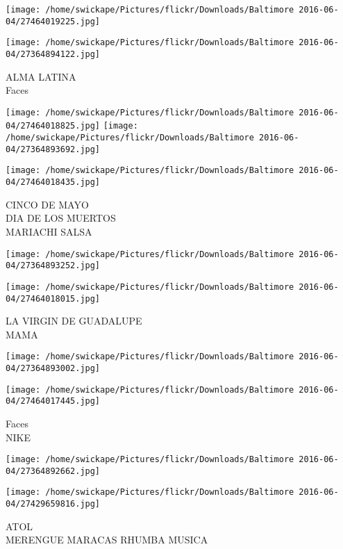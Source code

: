 \documentclass[10pt,letterpaper]{article}
\begin{document}
\texttt{[image: /home/swickape/Pictures/flickr/Downloads/Baltimore 2016-06-04/27464019225.jpg]}

\vspace{0.25in}
\texttt{[image: /home/swickape/Pictures/flickr/Downloads/Baltimore 2016-06-04/27364894122.jpg]}

ALMA LATINA\\
Faces
\pagebreak

\texttt{[image: /home/swickape/Pictures/flickr/Downloads/Baltimore 2016-06-04/27464018825.jpg]}
\texttt{[image: /home/swickape/Pictures/flickr/Downloads/Baltimore 2016-06-04/27364893692.jpg]}

\vspace{0.25in}
\texttt{[image: /home/swickape/Pictures/flickr/Downloads/Baltimore 2016-06-04/27464018435.jpg]}

CINCO DE MAYO\\
DIA DE LOS MUERTOS\\
MARIACHI SALSA
\pagebreak

\texttt{[image: /home/swickape/Pictures/flickr/Downloads/Baltimore 2016-06-04/27364893252.jpg]}

\vspace{0.25in}
\texttt{[image: /home/swickape/Pictures/flickr/Downloads/Baltimore 2016-06-04/27464018015.jpg]}

LA VIRGIN DE GUADALUPE\\
MAMA
\pagebreak

\texttt{[image: /home/swickape/Pictures/flickr/Downloads/Baltimore 2016-06-04/27364893002.jpg]}

\vspace{0.25in}
\texttt{[image: /home/swickape/Pictures/flickr/Downloads/Baltimore 2016-06-04/27464017445.jpg]}

Faces\\
NIKE
\pagebreak

\texttt{[image: /home/swickape/Pictures/flickr/Downloads/Baltimore 2016-06-04/27364892662.jpg]}

\vspace{0.25in}
\texttt{[image: /home/swickape/Pictures/flickr/Downloads/Baltimore 2016-06-04/27429659816.jpg]}

ATOL\\
MERENGUE MARACAS RHUMBA MUSICA
\pagebreak
\end{document}
